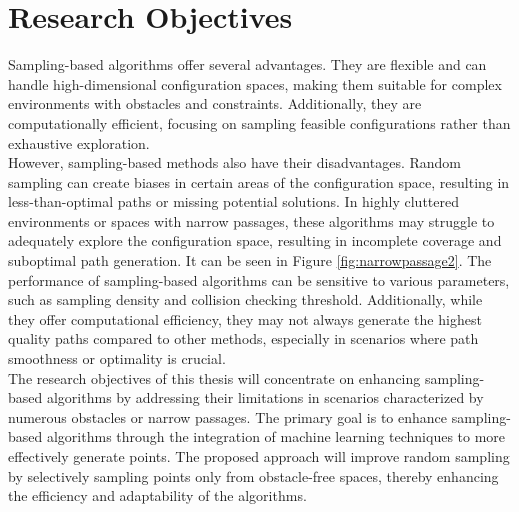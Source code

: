 \documentclass{ctuthesis}
\begin{document}
\section{Research Objectives} 
Sampling-based algorithms offer several advantages. 
They are flexible and can handle high-dimensional configuration spaces, 
making them suitable for complex environments with obstacles and constraints. 
Additionally, they are computationally efficient, 
focusing on sampling feasible configurations rather than exhaustive exploration.\\[12pt]
However, sampling-based methods also have their disadvantages. 
Random sampling can create biases in certain areas of the configuration space, 
resulting in less-than-optimal paths or missing potential solutions.
In highly cluttered environments or spaces with narrow passages, 
these algorithms may struggle to adequately explore the configuration space, 
resulting in incomplete coverage and suboptimal path generation. 
It can be seen in Figure \ref{fig:narrowpassage2}.
The performance of sampling-based algorithms can be sensitive to various parameters, 
such as sampling density and collision checking threshold. 
Additionally, while they offer computational efficiency, 
they may not always generate the highest quality paths compared to other methods, 
especially in scenarios where path smoothness or optimality is crucial.\\[12pt]
The research objectives of this thesis will concentrate on enhancing 
sampling-based algorithms by addressing their limitations in scenarios characterized by 
numerous obstacles or narrow passages. 
The primary goal is to enhance sampling-based algorithms through the integration of machine learning techniques to 
more effectively generate points. 
The proposed approach will improve random sampling by selectively sampling points 
only from obstacle-free spaces, 
thereby enhancing the efficiency and adaptability of the algorithms.

\end{document}
